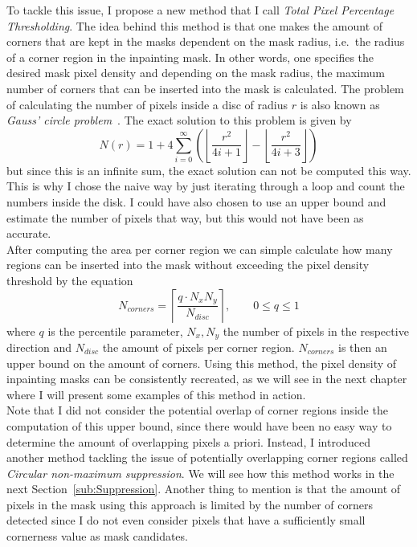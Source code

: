 To tackle this issue, I propose a new method that I call \textit{Total Pixel Percentage
Thresholding}. The idea behind this method is that one makes the amount of corners that are kept
in the masks dependent on the mask radius, i.e.\ the radius of a corner region in the inpainting
mask. In other words, one specifies the desired mask pixel density and depending on the mask
radius, the maximum number of corners that can be inserted into the mask is
calculated.
The problem of calculating the number of pixels inside a disc of radius $r$ is also known as
\textit{Gauss' circle problem}~\cite{gaussCircle}. The exact solution to this problem is given
by~\cite{hilbert96}
\begin{equation}
    N(r) = 1 + 4\sum_{i=0}^{\infty}\left(\left\lfloor\frac{r^2}{4i+1}\right\rfloor - \left\lfloor
    \frac{r^2}{4i+3}\right\rfloor\right)
\end{equation}
but since this is an infinite sum, the exact solution can not be computed this way. This is why I
chose the naive way by just iterating through a loop and count the numbers inside the disk.%
I could have also chosen to use an upper bound and estimate the number of pixels that 
way, but this would not have been as accurate.\\
\newpage\noindent
After computing the area per corner region we can simple calculate how many regions can be inserted
into the mask without exceeding the pixel density threshold by the equation
\begin{equation}
    N_{corners} = \left\lceil \frac{q \cdot N_{x}N_{y}}{N_{disc}} \right\rceil,\qquad0\leq q\leq 1 
\end{equation}
where $q$ is the percentile parameter, $N_x, N_y$ the number of pixels in the respective direction
and $N_{disc}$ the amount of pixels per corner region. $N_{corners}$ is then an upper bound on the
amount of corners.
Using this method, the pixel density of inpainting masks can be consistently recreated, as we will
see in the next chapter where I will present some examples of this method in action.\\
Note that I did not consider the potential overlap of corner regions inside the
computation of this upper bound, since there would have been no easy way to determine the amount of
overlapping pixels a priori.
Instead, I introduced another method tackling the issue of potentially overlapping corner regions
called \textit{Circular non-maximum suppression}. We will see how this method
works in the next Section~\ref{sub:Suppression}.
Another thing to mention is that the amount of pixels in the mask using this approach is limited by
the number of corners detected since I do not even consider pixels that have a sufficiently small
cornerness value as mask candidates.
\newpage
